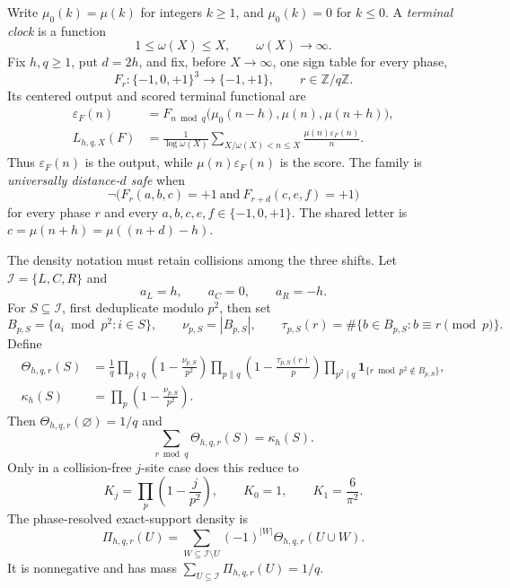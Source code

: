 \documentclass[11pt]{article}
\theoremstyle{definition}
\theoremstyle{remark}
\newcommand{\mob}{\mu}
\newcommand{\ind}{\mathbf 1}
\newcommand{\T}{\{-1,0,+1\}}
\newcommand{\Z}{\mathbb Z}
\begin{document}
Write \(\mob_0(k)=\mob(k)\) for integers \(k\geq1\), and
\(\mob_0(k)=0\) for \(k\leq0\).  A \emph{terminal clock} is a function
\begin{equation}
 1\leq\omega(X)\leq X,
 \qquad \omega(X)\longrightarrow\infty.
 \label{eq:clock}
\end{equation}
Fix \(h,q\geq1\), put \(d=2h\), and fix, before \(X\to\infty\), one sign
table for every phase,
\[
 F_r:\T^3\longrightarrow\{-1,+1\},\qquad r\in\Z/q\Z.
\]
Its centered output and scored terminal functional are
\begin{align}
 \varepsilon_F(n)
 &=F_{n\bmod q}\bigl(\mob_0(n-h),\mob(n),\mob(n+h)\bigr),
 \label{eq:output}\\
 L_{h,q,X}(F)
 &=\frac1{\log\omega(X)}
 \sum_{X/\omega(X)<n\leq X}\frac{\mob(n)\varepsilon_F(n)}n.
 \label{eq:functional}
\end{align}
Thus \(\varepsilon_F(n)\) is the output, while
\(\mob(n)\varepsilon_F(n)\) is the score.  The family is
\emph{universally distance-\(d\) safe} when
\begin{equation}
 \neg\bigl(F_r(a,b,c)=+1\ \text{and}\
 F_{r+d}(c,e,f)=+1\bigr)
 \label{eq:safety}
\end{equation}
for every phase \(r\) and every \(a,b,c,e,f\in\T\).  The shared letter is
\(c=\mob(n+h)=\mob((n+d)-h)\).

The density notation must retain collisions among the three shifts.  Let
\(\mathcal I=\{L,C,R\}\) and
\begin{equation}
 a_L=h,\qquad a_C=0,\qquad a_R=-h.
 \label{eq:coordinate-shifts}
\end{equation}
For \(S\subseteq\mathcal I\), first deduplicate modulo \(p^2\), then set
\begin{equation}
 B_{p,S}=\{a_i\bmod p^2:i\in S\},\qquad
 \nu_{p,S}=|B_{p,S}|,
 \qquad
 \tau_{p,S}(r)=\#\{b\in B_{p,S}:b\equiv r\pmod p\}.
 \label{eq:local-data}
\end{equation}
Define
\begin{align}
 \Theta_{h,q,r}(S)
 &=\frac1q
 \prod_{p\nmid q}\left(1-\frac{\nu_{p,S}}{p^2}\right)
 \prod_{p\parallel q}\left(1-\frac{\tau_{p,S}(r)}p\right)
 \prod_{p^2\mid q}
 \ind_{\{r\bmod p^2\notin B_{p,S}\}},
 \label{eq:theta}\\
 \kappa_h(S)
 &=\prod_p\left(1-\frac{\nu_{p,S}}{p^2}\right).
 \label{eq:kappa}
\end{align}
Then \(\Theta_{h,q,r}(\varnothing)=1/q\) and
\begin{equation}
 \sum_{r\bmod q}\Theta_{h,q,r}(S)=\kappa_h(S).
 \label{eq:phase-sum}
\end{equation}
Only in a collision-free \(j\)-site case does this reduce to
\begin{equation}
 K_j=\prod_p\left(1-\frac{j}{p^2}\right),\qquad
 K_0=1,\qquad K_1=\frac6{\pi^2}.
 \label{eq:Kj}
\end{equation}
The phase-resolved exact-support density is
\begin{equation}
 \Pi_{h,q,r}(U)=
 \sum_{W\subseteq\mathcal I\setminus U}(-1)^{|W|}
 \Theta_{h,q,r}(U\cup W).
 \label{eq:Pi}
\end{equation}
It is nonnegative and has mass
\(\sum_{U\subseteq\mathcal I}\Pi_{h,q,r}(U)=1/q\).
\end{document}
